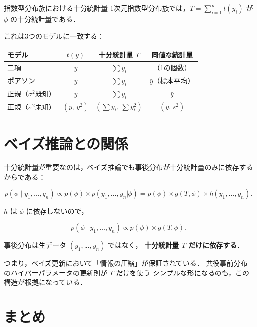 \documentclass[lualatex,ja=standard,a4paper,12pt]{bxjsarticle}
\begin{document}
\begin{thmbox}{指数型分布族における十分統計量}
1次元指数型分布族では，$T = \sum_{i=1}^n t(y_i)$ が $\phi$ の十分統計量である．
\end{thmbox}

これは3つのモデルに一致する：

\medskip
\begin{center}
\renewcommand{\arraystretch}{1.5}
\begin{tabular}{lccc}
\toprule
モデル & $t(y)$ & 十分統計量 $T$ & 同値な統計量 \\
\midrule
二項 & $y$ & $\sum y_i$ & （1の個数） \\
ポアソン & $y$ & $\sum y_i$ & $\bar{y}$（標本平均） \\
正規（$\sigma^2$既知） & $y$ & $\sum y_i$ & $\bar{y}$ \\
正規（$\sigma^2$未知） & $(y,\, y^2)$ & $(\sum y_i,\, \sum y_i^2)$ & $(\bar{y},\, s^2)$ \\
\bottomrule
\end{tabular}
\end{center}

\section{ベイズ推論との関係}

十分統計量が重要なのは，ベイズ推論でも事後分布が十分統計量のみに依存するからである：

\[
  p(\phi \mid y_1,\ldots,y_n)
  \propto p(\phi) \times p(y_1,\ldots,y_n|\phi)
  = p(\phi) \times g(T, \phi) \times h(y_1,\ldots,y_n).
\]

$h$ は $\phi$ に依存しないので，

\[
  p(\phi \mid y_1,\ldots,y_n) \propto p(\phi) \times g(T, \phi).
\]

\begin{pointbox}
事後分布は生データ $(y_1,\ldots,y_n)$ ではなく，
\textbf{十分統計量 $T$ だけに依存する}．

つまり，ベイズ更新において「情報の圧縮」が保証されている．
共役事前分布のハイパーパラメータの更新則が $T$ だけを使う
シンプルな形になるのも，この構造が根拠になっている．
\end{pointbox}

\section{まとめ}
\end{document}
